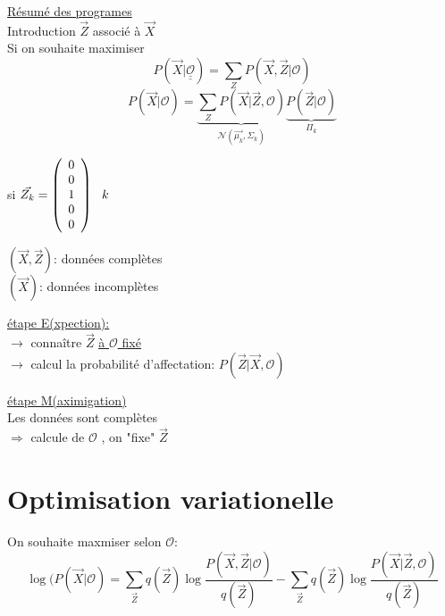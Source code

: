 \documentclass{article}
\newlength\tindent
\renewcommand{\indent}{\hspace*{\tindent}}
\newcommand{\tikzmark}[1]{\tikz[baseline,remember picture] \coordinate (#1) {};}
\newcommand{\Napp}{\mathcal{N}}
\newcommand{\Oapp}{\mathcal{O}}
\begin{document}
\underline{Résumé des programes}\\
Introduction $\vec{Z}$ associé à $\vec{X}$\\
Si on souhaite maximiser\\
$$P(\vec{X}|\underline{\underline{\Oapp}}) = \sum_Z P(\vec{X},\vec{Z}|\Oapp)$$
$$P(\vec{X}|\Oapp) = \underbrace{\sum_Z P(\vec{X}|\vec{Z},\Oapp)}_{\Napp(\vec{\mu_k},\Sigma_k)} \underbrace{P(\vec{Z}|\Oapp)}_{\Pi_k}$$
\vspace{1em}

si $\vec{Z_k} = \left( \begin{array}{l} 0\\0\\1\tikzmark{Zk2s}\\0\\0 \end{array} \right)\ \ \tikzmark{Zk2e}k$\\ 
\textbullet $(\vec{X},\vec{Z})$: données complètes\\
\textbullet $(\vec{X})$: données incomplètes
\vspace{1em}

\underline{étape E(xpection):}\\
\indent $\rightarrow$ connaître $\vec{Z}$ \color{red}\underline{\underline{à $\Oapp$ fixé}} \color{black}\\
\indent $\rightarrow$ calcul la probabilité d'affectation: $P(\vec{Z}|\vec{X},\Oapp)$
\vspace{1em}

\underline{étape M(aximigation)}\\
\indent Les données sont complètes\\
\indent $\Rightarrow$ calcule de $\Oapp$ \color{red}, on "fixe" $\vec{Z}$ \color{black}

\section{Optimisation variationelle}
On souhaite maxmiser selon $\Oapp:$\\
$$\log(P(\vec{X}|\Oapp) = \sum_{\vec{Z}} q(\vec{Z})\log\frac{P(\vec{X},\vec{Z}|\Oapp)}{q(\vec{Z})} - \sum_{\vec{Z}} q(\vec{Z})\log\frac{P(\vec{X}|\vec{Z},\Oapp)}{q(\vec{Z})}$$
\vspace{1em}
\end{document}
